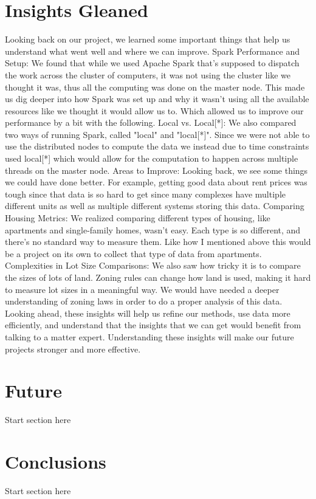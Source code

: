 \documentclass[titlepage]{article}
\begin{document}
\section{Insights Gleaned}
Looking back on our project, we learned some important things that help us understand what went well and where we can improve. Spark Performance and Setup: We found that while we used Apache Spark that's supposed to dispatch the work across the cluster of computers, it was not using the cluster like we thought it was, thus all the computing was done on the master node. This made us dig deeper into how Spark was set up and why it wasn't using all the available resources like we thought it would allow us to. Which allowed us to improve our performance by a bit with the following. Local vs. Local[*]: We also compared two ways of running Spark, called "local" and "local[*]". Since we were not able to use the distributed nodes to compute the data we instead due to time constraints used local[*] which would allow for the computation to happen across multiple threads on the master node. Areas to Improve: Looking back, we see some things we could have done better. For example, getting good data about rent prices was tough since that data is so hard to get since many complexes have multiple different units as well as multiple different systems storing this data. Comparing Housing Metrics: We realized comparing different types of housing, like apartments and single-family homes, wasn't easy. Each type is so different, and there's no standard way to measure them. Like how I mentioned above this would be a project on its own to collect that type of data from apartments. Complexities in Lot Size Comparisons: We also saw how tricky it is to compare the sizes of lots of land. Zoning rules can change how land is used, making it hard to measure lot sizes in a meaningful way. We would have needed a deeper understanding of zoning laws in order to do a proper analysis of this data. Looking ahead, these insights will help us refine our methods, use data more efficiently, and understand that the insights that we can get would benefit from talking to a matter expert. Understanding these insights will make our future projects stronger and more effective.

\section{Future}
Start section here

\section{Conclusions}
Start section here



\end{document}
